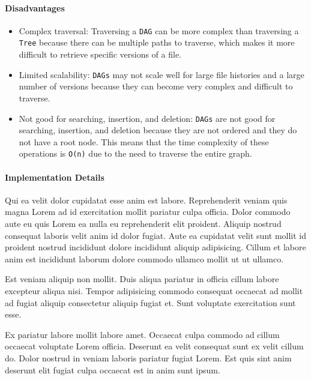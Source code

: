 \paragraph{Disadvantages}
\begin{itemize}
    \item Complex traversal: Traversing a \lstinline{DAG} can be more complex than traversing a \lstinline{Tree} because there can be multiple paths to traverse, which makes it more difficult to retrieve specific versions of a file.
    \item Limited scalability: \lstinline{DAGs} may not scale well for large file histories and a large number of versions because they can become very complex and difficult to traverse.
    \item Not good for searching, insertion, and deletion: \lstinline{DAGs} are not good for searching, insertion, and deletion because they are not ordered and they do not have a root node. This means that the time complexity of these operations is \lstinline{O(n)} due to the need to traverse the entire graph.
\end{itemize}

\paragraph{Implementation Details}
Qui ea velit dolor cupidatat esse anim est labore. Reprehenderit veniam quis magna Lorem ad id exercitation mollit pariatur culpa officia. Dolor commodo aute eu quis Lorem ea nulla eu reprehenderit elit proident. Aliquip nostrud consequat laboris velit anim id dolor fugiat. Aute ea cupidatat velit sunt mollit id proident nostrud incididunt dolore incididunt aliquip adipisicing. Cillum et labore anim est incididunt laborum dolore commodo ullamco mollit ut ut ullamco.

Est veniam aliquip non mollit. Duis aliqua pariatur in officia cillum labore excepteur aliqua nisi. Tempor adipisicing commodo consequat occaecat ad mollit ad fugiat aliquip consectetur aliquip fugiat et. Sunt voluptate exercitation sunt esse.

Ex pariatur labore mollit labore amet. Occaecat culpa commodo ad cillum occaecat voluptate Lorem officia. Deserunt ea velit consequat sunt ex velit cillum do. Dolor nostrud in veniam laboris pariatur fugiat Lorem. Est quis sint anim deserunt elit fugiat culpa occaecat est in anim sunt ipsum.

